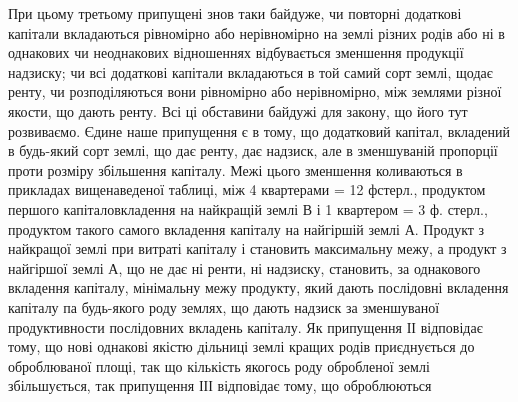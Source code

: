 При цьому третьому припущені знов таки байдуже, чи повторні додаткові
капітали вкладаються рівномірно або нерівномірно на землі різних родів або ні
в однакових чи неоднакових відношеннях відбувається зменшення продукції
надзиску; чи всі додаткові капітали вкладаються в той самий сорт землі, щодає
ренту, чи розподіляються вони рівномірно або нерівномірно, між землями
різної якости, що дають ренту. Всі ці обставини байдужі для закону, що його тут
розвиваємо. Єдине наше припущення є в тому, що додатковий капітал,
вкладений в будь-який сорт землі, що дає ренту, дає надзиск, але в зменшуваній
пропорції проти розміру збільшення капіталу. Межі цього зменшення
коливаються в прикладах вищенаведеної таблиці, між 4 квартерами = 12 фстерл.,
продуктом першого капіталовкладення на найкращій землі В і 1 квартером
= 3 ф. стерл., продуктом такого самого вкладення капіталу на найгіршій
землі А. Продукт з найкращої землі при витраті капіталу і становить максимальну
межу, а продукт з найгіршої землі А, що не дає ні ренти, ні надзиску,
становить, за однакового вкладення капіталу, мінімальну межу продукту,
який дають послідовні вкладення капіталу па будь-якого роду землях, що дають надзиск за зменшуваної
продуктивности послідовних вкладень капіталу. Як
припущення ІІ відповідає тому, що нові однакові якістю дільниці землі кращих
родів приєднується до оброблюваної площі, так що кількість якогось роду обробленої
землі збільшується, так припущення ІІІ відповідає тому, що оброблюються
